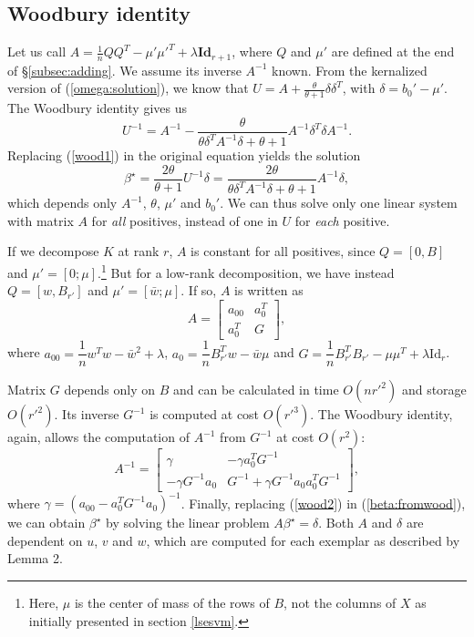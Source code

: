 \subsection{Woodbury identity}
Let us call $A=\frac{1}{n}QQ^T-\mu'\mu'^T+\lambda\textbf{Id}_{r+1}$, where $Q$ and $\mu'$ are defined at the end of \S \ref{subsec:adding}. We assume its inverse $A^{-1}$ known. From the kernalized version of (\ref{omega:solution}), we know that $U=A+\frac{\theta}{\theta+1}\delta\delta^T$, with $\delta=b_0'-\mu'$. The Woodbury identity gives us 
\begin{equation}
U^{-1}=A^{-1} -\dfrac{\theta}{\theta\delta^TA^{-1}\delta+ \theta+1}A^{-1}\delta^T\delta A^{-1}.\label{wood1}
\end{equation}
Replacing (\ref{wood1}) in the original equation yields the solution
\begin{equation}
\beta^\star = \dfrac{2\theta}{\theta+1}U^{-1}\delta = \dfrac{2\theta}{\theta\delta^TA^{-1}\delta+ \theta+1}A^{-1}\delta,\label{beta:fromwood}
\end{equation}
which depends only $A^{-1}$, $\theta$, $\mu'$ and $b_0'$. 
We can thus solve only one linear system with matrix $A$ for \textit{all} positives, instead of one in $U$ for \textit{each} positive.

If we decompose $K$ at rank $r$, $A$ is constant for all positives, since $Q = [0, B]$ and $\mu'=[0; \mu]$.\footnote{Here, $\mu$ is the center of mass of the rows of $B$, not the columns of $X$ as initially presented in section \ref{lsesvm}.} 
But for a low-rank decomposition, we have instead $Q=[w, B_{r'}]$ and $\mu' = [\bar{w}; \mu]$. If so, $A$ is written as 
\begin{equation}
A = \begin{bmatrix}
a_{00} & a_0^T\\
a_0^T & G
\end{bmatrix},
\end{equation}
where $a_{00}=\dfrac{1}{n}w^Tw-\bar{w}^2+\lambda$, $a_0 = \dfrac{1}{n}B_{r'}^Tw-\bar{w}\mu$ and $G=\dfrac{1}{n}B_{r'}^TB_{r'}-\mu\mu^T+\lambda\text{Id}_r$.

Matrix $G$ depends only on $B$ and can be calculated in time $O(nr'^2)$ and storage $O(r'^2)$. 
Its inverse $G^{-1}$ is computed at cost $O(r'^3)$.
The Woodbury identity, again, allows the computation of $A^{-1}$ from $G^{-1}$ at cost $O(r^2)$:
\begin{equation}
A^{-1} = \begin{bmatrix}\gamma & -\gamma a_0^TG^{-1}\\ -\gamma G^{-1}a_0 & G^{-1}+\gamma G^{-1}a_0a_0^TG^{-1}\end{bmatrix},\label{wood2}
\end{equation}
where $\gamma = \left(a_{00}-a_0^TG^{-1}a_0\right)^{-1}$. Finally, replacing (\ref{wood2}) in (\ref{beta:fromwood}), we can obtain $\beta^\star$ by solving the linear problem $A\beta^\star = \delta$. 
Both $A$ and $\delta$ are dependent on $u$, $v$ and $w$, which are computed for each exemplar as described by Lemma 2.

